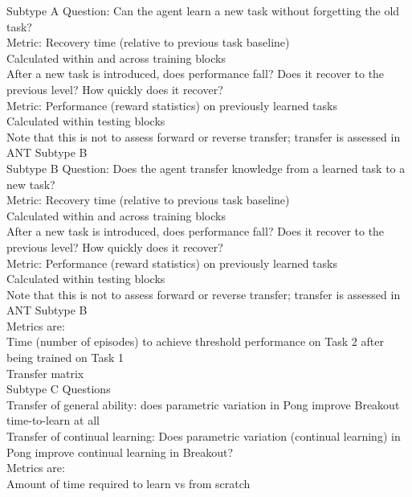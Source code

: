 Subtype A
Question: Can the agent learn a new task without forgetting the old task?\\
                Metric: Recovery time (relative to previous task baseline)\\
                    Calculated within and across training blocks \\
                    After a new task is introduced, does performance fall? Does it recover to the previous level? How quickly does it recover? \\
                Metric: Performance (reward statistics) on previously learned tasks\\
                    Calculated within testing blocks\\
                    Note that this is not to assess forward or reverse transfer; transfer is assessed in ANT Subtype B\\
Subtype B   
Question: Does the agent transfer knowledge from a learned task to a new task?\\
            Metric: Recovery time (relative to previous task baseline)\\
                Calculated within and across training blocks \\
                After a new task is introduced, does performance fall? Does it recover to the previous level? How quickly does it recover? \\
            Metric: Performance (reward statistics) on previously learned tasks\\
                Calculated within testing blocks\\
                Note that this is not to assess forward or reverse transfer; transfer is assessed in ANT Subtype B\\
        Metrics are:\\
            Time (number of episodes) to achieve threshold performance on Task 2 after being trained on Task 1\\
            Transfer matrix\\        
Subtype C           
        Questions\\
            Transfer of general ability: does parametric variation in Pong improve Breakout time-to-learn at all\\
            Transfer of continual learning: Does parametric variation (continual learning) in Pong improve continual learning in Breakout?\\
        Metrics are:\\
            Amount of time required to learn vs from scratch \\
\fi
